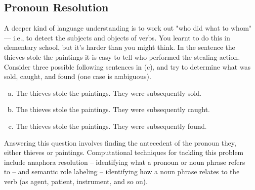 \subsection{Pronoun Resolution}
A deeper kind of language understanding is to work out "who did what to whom" — i.e., to detect the subjects and objects of verbs. You learnt to do this in elementary school, but it's harder than you might think. In the sentence the thieves stole the paintings it is easy to tell who performed the stealing action. Consider three possible following sentences in (c), and try to determine what was sold, caught, and found (one case is ambiguous).
\begin{enumerate}[a.]
    \item The thieves stole the paintings. They were subsequently sold.
    \item The thieves stole the paintings. They were subsequently caught.
    \item The thieves stole the paintings. They were subsequently found.
\end{enumerate}
Answering this question involves finding the antecedent of the pronoun they, either thieves or paintings. Computational techniques for tackling this problem include anaphora resolution -- identifying what a pronoun or noun phrase refers to -- and semantic role labeling -- identifying how a noun phrase relates to the verb (as agent, patient, instrument, and so on).

